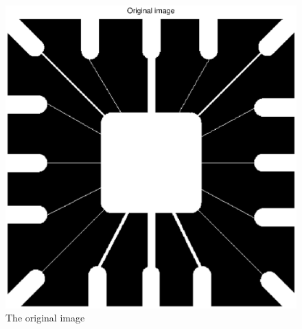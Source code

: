 \begin{figure}[htb]
 \centering
 \includegraphics[width=\linewidth]{original_wirebond.eps}
 \caption{The original image}
 \label{fig:original_wirebond}
\end{figure}

